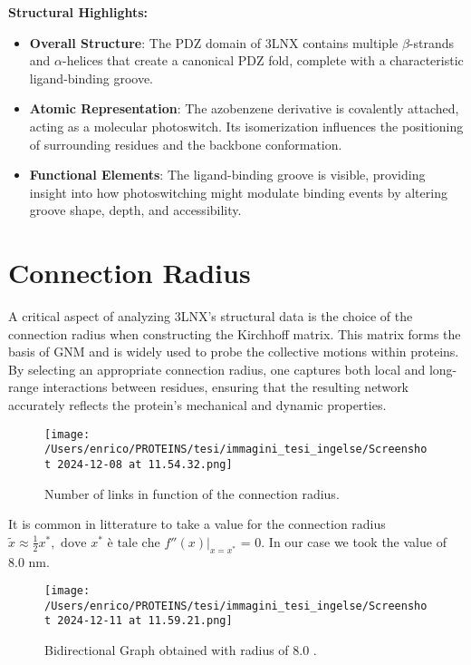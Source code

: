 \documentclass[English, Lau, oneside]{sapthesis}
\begin{document}
\noindent\textbf{Structural Highlights:}
\begin{itemize}
    \item \textbf{Overall Structure}: The PDZ domain of 3LNX contains multiple $\beta$-strands and $\alpha$-helices that create a canonical PDZ fold, complete with a characteristic ligand-binding groove.
    \item \textbf{Atomic Representation}: The azobenzene derivative is covalently attached, acting as a molecular photoswitch. Its isomerization influences the positioning of surrounding residues and the backbone conformation.
    \item \textbf{Functional Elements}: The ligand-binding groove is visible, providing insight into how photoswitching might modulate binding events by altering groove shape, depth, and accessibility.
\end{itemize}

\newpage
\section*{Connection Radius}

\noindent A critical aspect of analyzing 3LNX’s structural data is the choice of the connection radius when constructing the Kirchhoff matrix. 
This matrix forms the basis of GNM and is widely used to probe the collective motions within proteins.
By selecting an appropriate connection radius, one captures both local and long-range interactions between residues, ensuring that the resulting network accurately reflects the protein’s mechanical and dynamic properties.

\begin{figure}[h!]
    \centering
    \texttt{[image: /Users/enrico/PROTEINS/tesi/immagini\_tesi\_ingelse/Screenshot 2024-12-08 at 11.54.32.png]}
    \caption{ Number of links in function of the connection radius.}
\end{figure}

It is common in litterature to take a value for the connection radius $\tilde{x} \approx \frac{1}{2} x^*, \text{ dove } x^* \text{ è tale che } f''(x) \big|_{x = x^*}$ = 0. In our case we took the value of 8.0 nm.\\
\begin{figure}[h!]
    \centering
    \texttt{[image: /Users/enrico/PROTEINS/tesi/immagini\_tesi\_ingelse/Screenshot 2024-12-11 at 11.59.21.png]}
    \caption{Bidirectional Graph obtained with radius of 8.0 .}
\end{figure}
\end{document}
